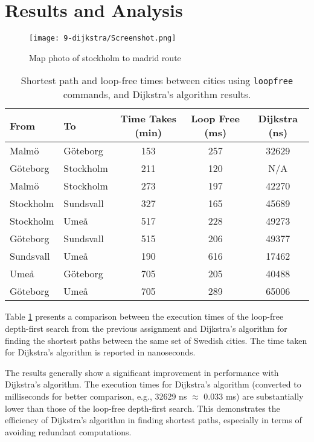 \documentclass[a4paper,11pt]{article}
\begin{document}
\section*{Results and Analysis}
\begin{figure}
    \texttt{[image: 9-dijkstra/Screenshot.png]}
    \caption{Map photo of stockholm to madrid route}
    \label{fig:stockholm2madrid}
\end{figure}


\begin{table}[h]
    \centering
    \begin{tabular}{|l|l|c|c|c|}
    \hline
    \textbf{From} & \textbf{To} & \textbf{Time Takes (min)} & \textbf{Loop Free (ms)} & \textbf{Dijkstra (ns)} \\
    \hline
    Malmö & Göteborg & 153 & 257 & 32629 \\
    Göteborg & Stockholm & 211 & 120 & N/A \\
    Malmö & Stockholm & 273 & 197 & 42270 \\
    Stockholm & Sundsvall & 327 & 165 & 45689 \\
    Stockholm & Umeå & 517 & 228 & 49273 \\
    Göteborg & Sundsvall & 515 & 206 & 49377 \\
    Sundsvall & Umeå & 190 & 616 & 17462 \\
    Umeå & Göteborg & 705 & 205 & 40488 \\
    Göteborg & Umeå & 705 & 289 & 65006 \\
    \hline
    \end{tabular}
    \caption{Shortest path and loop-free times between cities using \texttt{loopfree} commands, and Dijkstra's algorithm results.}
    \label{tab:city_paths_updated}
\end{table}

Table \ref{tab:city_paths_updated} presents a comparison between the execution times of the loop-free depth-first search from the previous assignment and Dijkstra's algorithm for finding the shortest paths between the same set of Swedish cities. The time taken for Dijkstra's algorithm is reported in nanoseconds.

The results generally show a significant improvement in performance with Dijkstra's algorithm. The execution times for Dijkstra's algorithm (converted to milliseconds for better comparison, e.g., 32629 ns $\approx$ 0.033 ms) are substantially lower than those of the loop-free depth-first search. This demonstrates the efficiency of Dijkstra's algorithm in finding shortest paths, especially in terms of avoiding redundant computations.
\end{document}
